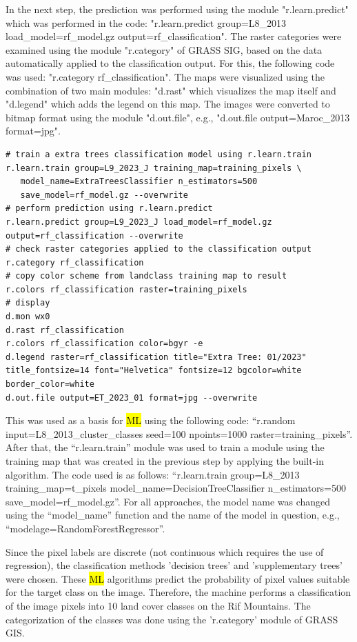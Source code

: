 \documentclass[geomatics,article,submit,pdftex,moreauthors]{Definitions/mdpi}
\begin{document}
In the next step, the prediction was performed using the module "r.learn.predict" which was performed in the code: "r.learn.predict group=L8\_2013 load\_model=rf\_model.gz output=rf\_classification". The raster categories were examined using the module "r.category" of GRASS SIG, based on the data automatically applied to the classification output. For this, the following code was used: "r.category rf\_classification". The maps were visualized using the combination of two main modules: "d.rast" which visualizes the map itself and "d.legend" which adds the legend on this map. The images were converted to bitmap format using the module "d.out.file", e.g., "d.out.file output=Maroc\_2013 format=jpg".

\begin{footnotesize}
\begin{verbatim}
# train a extra trees classification model using r.learn.train
r.learn.train group=L9_2023_J training_map=training_pixels \
   model_name=ExtraTreesClassifier n_estimators=500 
   save_model=rf_model.gz --overwrite
# perform prediction using r.learn.predict
r.learn.predict group=L9_2023_J load_model=rf_model.gz  output=rf_classification --overwrite
# check raster categories applied to the classification output
r.category rf_classification
# copy color scheme from landclass training map to result
r.colors rf_classification raster=training_pixels
# display
d.mon wx0
d.rast rf_classification
r.colors rf_classification color=bgyr -e
d.legend raster=rf_classification title="Extra Tree: 01/2023" 
title_fontsize=14 font="Helvetica" fontsize=12 bgcolor=white 
border_color=white
d.out.file output=ET_2023_01 format=jpg --overwrite
\end{verbatim}
\end{footnotesize}

This was used as a basis for \hl{ML} using the following code: “r.random input=L8\_2013\_cluster\_classes seed=100 npoints=1000 raster=training\_pixels”. After that, the “r.learn.train” module was used to train a module using the training map that was created in the previous step by applying the built-in algorithm. The code used is as follows: “r.learn.train group=L8\_2013 training\_map=t\_pixels model\_name=DecisionTreeClassifier n\_estimators=500 save\_model=rf\_model.gz”. For all approaches, the model name was changed using the “model\_name” function and the name of the model in question, e.g., “modelage=RandomForestRegressor”.

Since the pixel labels are discrete (not continuous which requires the use of regression), the classification methods 'decision trees' and 'supplementary trees' were chosen. These \hl{ML} algorithms predict the probability of pixel values suitable for the target class on the image. Therefore, the machine performs a classification of the image pixels into 10 land cover classes on the Rif Mountains. The categorization of the classes was done using the 'r.category' module of GRASS GIS. 
\end{document}
